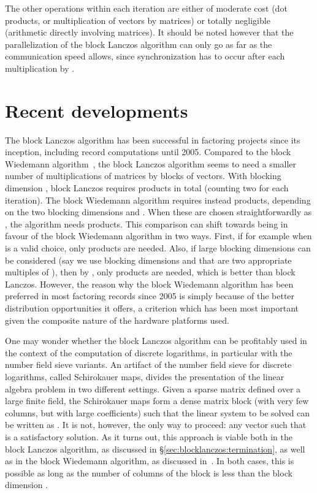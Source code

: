 The other operations within each iteration are either of moderate cost (dot
products, or multiplication of vectors by  matrices) or totally
negligible (arithmetic directly involving  matrices). It should
be noted however that the parallelization of the block Lanczos algorithm
can only go as far as the communication speed allows, since synchronization
has to occur after each multiplication by .

\section{Recent developments}
\label{sec:blocklanczos:recent}

The block Lanczos algorithm has been successful in factoring projects since
its inception, including record computations until 2005. Compared to the
block Wiedemann algorithm~\cite{Coppersmith94}, the block Lanczos algorithm
seems to need a smaller number of multiplications of matrices by blocks of vectors.
With blocking dimension , block Lanczos requires  products
in total (counting two for each iteration). The block Wiedemann algorithm
requires instead  products, depending on the two
blocking dimensions  and . When these are
chosen
straightforwardly as , the algorithm needs  products. This
comparison can shift towards
being in favour of the block Wiedemann algorithm in two ways. First,
if for example when  is a valid choice, only 
products are needed. Also, if large blocking dimensions can be considered
(say we use blocking dimensions  and  that are two appropriate multiples of ), then by
\cite[Theorem 7]{Kaltofen95}, only  products are needed,
which is better than block Lanczos.
However, the reason why the block Wiedemann algorithm has been
preferred in most factoring records since 2005 is simply because of the better
distribution opportunities it offers, a criterion which has been most
important given the composite nature of the hardware platforms used.

One may wonder whether the block Lanczos algorithm can be profitably used
in the context of the computation of discrete logarithms, in particular
with the number field sieve variants. An artifact of the number field sieve
for discrete logarithms, called Schirokauer maps, divides the presentation
of the linear algebra problem in two different settings. Given a sparse
matrix  defined over a large finite field, the Schirokauer maps form a
dense matrix block  (with very few columns, but with large coefficients)
such that the linear system to be solved can be written as
. It is not, however, the only way to proceed: any
vector  such that  is a satisfactory solution.
As it turns out, this approach is viable both in the block Lanczos
algorithm, as discussed in §\ref{sec:blocklanczos:termination}, as well as in the block
Wiedemann algorithm, as discussed in~\cite[§8]{Coppersmith94}. In both
cases, this is possible as long as the number of columns of the block
 is less than the block dimension .

%